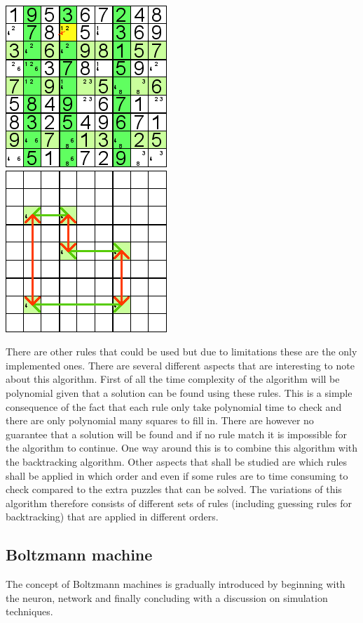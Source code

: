 \documentclass[a4paper,11pt]{kth-mag}
\begin{document}
\begin{description}
\includegraphics{images/swordfish1.png}\\
\includegraphics{images/swordfish2.png}

\end{description}

There are other rules that could be used but due to limitations these are the only implemented ones.
There are several different aspects that are interesting to note about this algorithm.
First of all the time complexity of the algorithm will be polynomial given that a solution can be found using these rules.
This is a simple consequence of the fact that each rule only take polynomial time to check and there are only polynomial many squares to fill in.
There are however no guarantee that a solution will be found and if no rule match it is impossible for the algorithm to continue.
One way around this is to combine this algorithm with the backtracking algorithm.
Other aspects that shall be studied are which rules shall be applied in which order and even if some rules are to time consuming to check compared to the extra puzzles that can be solved.
The variations of this algorithm therefore consists of different sets of rules (including guessing rules for backtracking) that are applied in different orders. 

\subsection{Boltzmann machine}
The concept of Boltzmann machines is gradually introduced by beginning with the neuron, network and finally concluding with a discussion on simulation techniques.\\
\end{document}
